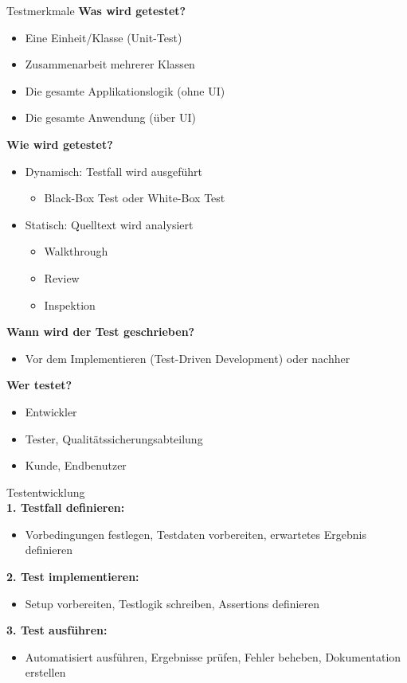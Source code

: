 \begin{corollary}{Testmerkmale}
\textbf{Was wird getestet?}
\begin{itemize}
    \item Eine Einheit/Klasse (Unit-Test)
    \item Zusammenarbeit mehrerer Klassen
    \item Die gesamte Applikationslogik (ohne UI)
    \item Die gesamte Anwendung (über UI)
\end{itemize}

\textbf{Wie wird getestet?}
\begin{itemize}
    \item Dynamisch: Testfall wird ausgeführt
    \begin{itemize}
        \item Black-Box Test oder White-Box Test
    \end{itemize}
    \item Statisch: Quelltext wird analysiert
    \begin{itemize}
        \item Walkthrough
        \item Review
        \item Inspektion
    \end{itemize}
\end{itemize}

\textbf{Wann wird der Test geschrieben?}
\begin{itemize}
    \item Vor dem Implementieren (Test-Driven Development) oder nachher
\end{itemize}

\textbf{Wer testet?}
\begin{itemize}
    \item Entwickler
    \item Tester, Qualitätssicherungsabteilung
    \item Kunde, Endbenutzer
\end{itemize}
\end{corollary}

\begin{KR}{Testentwicklung}\\
\textbf{1. Testfall definieren:}
\begin{itemize}
    \item Vorbedingungen festlegen, Testdaten vorbereiten, erwartetes Ergebnis definieren
\end{itemize}

\textbf{2. Test implementieren:}
\begin{itemize}
    \item Setup vorbereiten, Testlogik schreiben, Assertions definieren
\end{itemize}

\textbf{3. Test ausführen:}
\begin{itemize}
    \item Automatisiert ausführen, Ergebnisse prüfen, Fehler beheben, Dokumentation erstellen
\end{itemize}
\end{KR}




